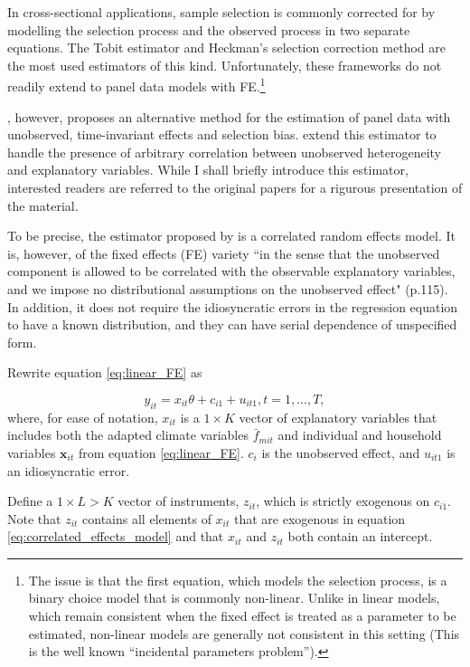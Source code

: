 \documentclass[a4paper,12pt]{article}
\theoremstyle{plain}
\theoremstyle{definition}
\theoremstyle{definition}
\theoremstyle{definition}
\theoremstyle{definition}
\begin{document}
In cross-sectional applications, sample selection is commonly corrected for by modelling the selection process and the observed process in two separate equations. The Tobit estimator \citep{tobin1958,amemiya1984} and Heckman's selection correction \citep{heckman1979} method are the most used estimators of this kind. Unfortunately, these frameworks do not readily extend to panel data models with FE.\footnote{The issue is that the first equation, which models the selection process, is a binary choice model that is commonly non-linear. Unlike in linear models, which remain consistent when the fixed effect is treated as a parameter to be estimated, non-linear models are generally not consistent in this setting (This is the well known ``incidental parameters problem'').}

\citet{wooldridge1995}, however, proposes an alternative method for the estimation of panel data with unobserved, time-invariant effects and selection bias. \citet{semykina2010} extend this estimator to handle the presence of arbitrary correlation between unobserved heterogeneity and explanatory variables. While I shall briefly introduce this estimator, interested readers are referred to the original papers for a rigurous presentation of the material.

To be precise, the estimator proposed by \citet{wooldridge1995} is a correlated random effects model. It is, however, of the fixed effects (FE) variety ``in the sense that the unobserved component is allowed to be correlated with the observable explanatory variables, and we impose no distributional assumptions on the unobserved effect" (p.115). In addition, it does not require the idiosyncratic errors in the regression equation to have a known distribution, and they can have serial dependence of unspecified form.

Rewrite equation \ref{eq:linear_FE} as

\begin{equation}
    \label{eq:correlated_effects_model}
    y_{it}=x_{it}\theta + c_{i1}+u_{it1}, t=1,...,T,
\end{equation}
where, for ease of notation, $x_{it}$ is a $1\times K$ vector of explanatory variables that includes both the adapted climate variables $\bar{f}_{mit}$ and individual and household variables $\mathbf{x}_{it}$ from equation \ref{eq:linear_FE}. $c_{i}$ is the unobserved effect, and $u_{it1}$ is an idiosyncratic error.

Define a $1\times L>K$ vector of instruments, $z_{it}$, which is strictly exogenous on $c_{i1}$. Note that $z_{it}$ contains all elements of $x_{it}$ that are exogenous in equation \ref{eq:correlated_effects_model} and that $x_{it}$ and $z_{it}$ both contain an intercept.
\end{document}
